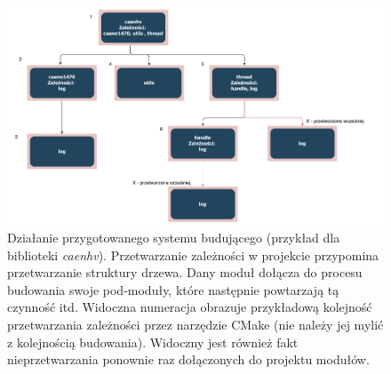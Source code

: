 \begin{figure}
\centering
\caption{Działanie przygotowanego systemu budującego (przykład dla biblioteki \textit{caenhv}). Przetwarzanie zależności w projekcie przypomina przetwarzanie struktury drzewa. Dany moduł dołącza do procesu budowania swoje pod-moduły, które następnie powtarzają tą czynność itd. Widoczna numeracja obrazuje przykładową kolejność przetwarzania zależności przez narzędzie CMake (nie należy jej mylić z kolejnością budowania). Widoczny jest również fakt nieprzetwarzania ponownie raz dołączonych do projektu modułów.}
\label{fig:cmakeorder}
\includegraphics[width=\textwidth]{res/CMakeOrder.pdf}
\end{figure}


